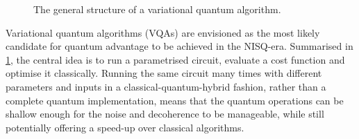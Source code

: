 \begin{figure}
\caption{
    The general structure of a variational quantum algorithm.
}
\label{fig:vqa}
\end{figure}

Variational quantum algorithms (VQAs) are envisioned as the most likely candidate for quantum advantage to be achieved in the NISQ-era.
Summarised in \cref{fig:vqa}, the central idea is to run a parametrised circuit, evaluate a cost function and optimise it classically.
Running the same circuit many times with different parameters and inputs in a classical-quantum-hybrid fashion, rather than a complete quantum implementation, means that the quantum operations can be shallow enough for the noise and decoherence to be manageable, while still potentially offering a speed-up over classical algorithms.


